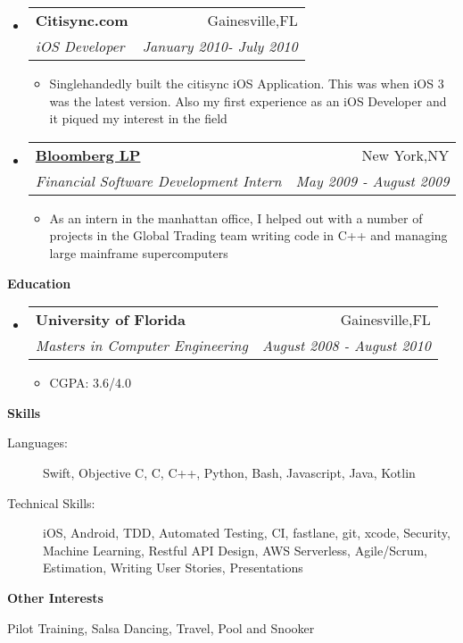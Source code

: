 \documentclass[letterpaper,11pt]{article}
\makeatletter
\newcommand{\resitem}[1]{\item #1 \vspace{-2pt}}
\newcommand{\resheading}[1]{{\large \colorbox{mygrey}{\begin{minipage}{\textwidth}{\textbf{#1 \vphantom{p\^{E}}}}\end{minipage}}}}
\newcommand{\ressubheading}[4]{
\begin{tabular*}{7.0in}{l@{\extracolsep{\fill}}r}
    \textbf{#1} & #2 \\
    \textit{#3} & \textit{#4} \\
\end{tabular*}\vspace{-6pt}}
\makeatother
\begin{document}
\begin{itemize}
\item
    \ressubheading{Citisync.com}{Gainesville,FL}{iOS Developer}{January 2010- July 2010}
    \begin{itemize}
        \resitem{Singlehandedly built the citisync iOS Application. This was when iOS 3 was the latest version. Also my first experience as an iOS Developer and it piqued my interest in the field}
    \end{itemize}
                
\item
    \ressubheading{\href{http://www.bloomberg.com}{Bloomberg LP}}{New York,NY}{Financial Software Development Intern}{May 2009 - August 2009}
    \begin{itemize}
      \resitem{As an intern in the manhattan office, I helped out with a number of projects in the Global Trading team writing code in C++ and managing large mainframe supercomputers}
    \end{itemize}
    
    
\end{itemize}

\vspace{0.3in}
  
\resheading{Education}
\begin{itemize}
\item
    \ressubheading{University of Florida}{Gainesville,FL}{{Masters in Computer Engineering}}{August 2008 - August 2010}
    \begin{itemize}
        \resitem{CGPA: 3.6/4.0}
    \end{itemize}
\end{itemize}

\vspace{0.3in}

\resheading{Skills}
\begin{description}
\item[Languages:]
Swift, Objective C, C, C++, Python, Bash, Javascript, Java, Kotlin
\item[Technical Skills:] iOS, Android, TDD, Automated Testing, CI, fastlane, git, xcode, Security, Machine Learning, Restful API Design, AWS Serverless, Agile/Scrum, Estimation, Writing User Stories, Presentations

\end{description}

\vspace{0.2in}

\resheading{Other Interests}
\begin{description}
\item Pilot Training, Salsa Dancing, Travel, Pool and Snooker
\end{description}
\end{document}
